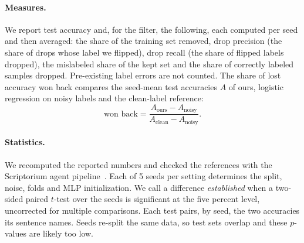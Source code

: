 \paragraph{Measures.} We report test accuracy and, for the filter, the following, each computed per seed and then averaged: the share of the training set removed, drop precision (the share of drops whose label we flipped), drop recall (the share of flipped labels dropped), the mislabeled share of the kept set and the share of correctly labeled samples dropped. Pre-existing label errors are not counted. The share of lost accuracy won back compares the seed-mean test accuracies $A$ of ours, logistic regression on noisy labels and the clean-label reference:
\begin{equation}
  \text{won back} = \frac{A_{\mathrm{ours}} - A_{\mathrm{noisy}}}{A_{\mathrm{clean}} - A_{\mathrm{noisy}}} .
  \label{eq:wonback}
\end{equation}

\paragraph{Statistics.} We recomputed the reported numbers and checked the references with the Scriptorium agent pipeline~\citep{scriptorium2026}. Each of 5 seeds per setting determines the split, noise, folds and MLP initialization. We call a difference \emph{established} when a two-sided paired $t$-test over the seeds is significant at the five percent level, uncorrected for multiple comparisons. Each test pairs, by seed, the two accuracies its sentence names. Seeds re-split the same data, so test sets overlap and these $p$-values are likely too low.
